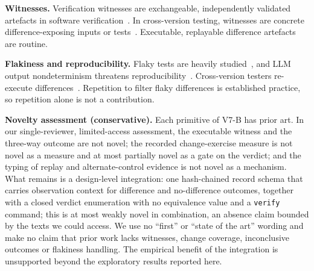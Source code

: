 \textbf{Witnesses.} Verification witnesses are exchangeable, independently validated artefacts in software verification~\cite{beyer2022verification,beyer2015witness,beyer2016correctness}. In cross-version testing, witnesses are concrete difference-exposing inputs or tests~\cite{palikareva2016,etemadi2024mokav,pradel2025testora,leCong2026patchguru}. Executable, replayable difference artefacts are routine.

\textbf{Flakiness and reproducibility.} Flaky tests are heavily studied~\cite{luo2014an,lam2019idflakies,parry2021a}, and LLM output nondeterminism threatens reproducibility~\cite{ouyang2025an}. Cross-version testers re-execute differences~\cite{pradel2025testora,hu2026difftestgen}. Repetition to filter flaky differences is established practice, so repetition alone is not a contribution.

\textbf{Novelty assessment (conservative).} Each primitive of V7-B has prior art. In our single-reviewer, limited-access assessment, the executable witness and the three-way outcome are not novel; the recorded change-exercise measure is not novel as a measure and at most partially novel as a gate on the verdict; and the typing of replay and alternate-control evidence is not novel as a mechanism. What remains is a design-level integration: one hash-chained record schema that carries observation context for difference and no-difference outcomes, together with a closed verdict enumeration with no equivalence value and a \texttt{verify} command; this is at most weakly novel in combination, an absence claim bounded by the texts we could access. We use no ``first'' or ``state of the art'' wording and make no claim that prior work lacks witnesses, change coverage, inconclusive outcomes or flakiness handling. The empirical benefit of the integration is unsupported beyond the exploratory results reported here.

